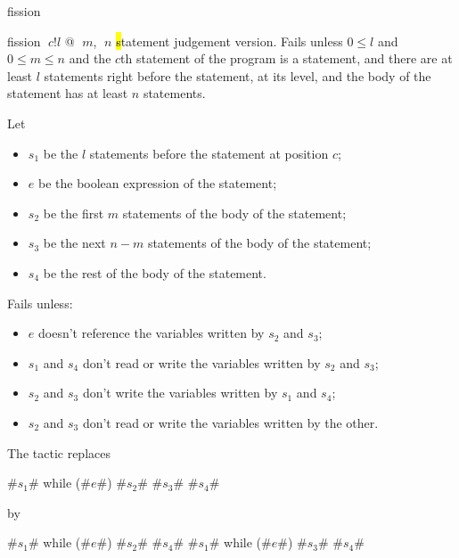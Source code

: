 \begin{tactic}{fission}
  \begin{tsyntax}{fission $\;c$!$l$ @ $\;m$, $\;n$}
    \hl statement judgement version.  Fails unless $0\leq l$ and
    $0\leq m\leq n$ and the $c$th statement of the program is a
     statement, and there are at least $l$ statements right
    before the  statement, at its level, and the body of the
     statement has at least $n$ statements.

    Let
    \begin{itemize}
    \item $s_1$ be the $l$ statements before the  statement
      at position $c$;

    \item $e$ be the boolean expression of the  statement;

    \item $s_2$ be the first $m$ statements of the body of the
       statement;

    \item $s_3$ be the next $n - m$ statements of the body of the
       statement;

    \item $s_4$ be the rest of the body of the  statement.
    \end{itemize}
    Fails unless:
    \begin{itemize}
    \item $e$ doesn't reference the variables written by $s_2$ and $s_3$;

    \item $s_1$ and $s_4$ don't read or write the variables written by
      $s_2$ and $s_3$;

    \item $s_2$ and $s_3$ don't write the variables written by $s_1$
      and $s_4$;

    \item $s_2$ and $s_3$ don't read or write the variables written by
      the other.
    \end{itemize}
    The tactic replaces
\begin{easycrypt}{}{}
#$s_1$# while (#$e$#) { #$s_2$# #$s_3$# #$s_4$# }
\end{easycrypt}
    by
\begin{easycrypt}{}{}
#$s_1$# while (#$e$#) { #$s_2$# #$s_4$# }
#$s_1$# while (#$e$#) { #$s_3$# #$s_4$# }
\end{easycrypt}


\end{tsyntax}
\end{tactic}
